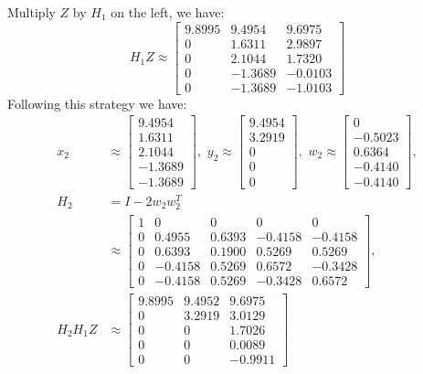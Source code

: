 \documentclass[11pt]{article}
\begin{document}
Multiply $Z$ by $H_1$ on the left, we have:
$$H_1Z \approx \begin{bmatrix} 
9.8995 & 9.4954 & 9.6975 \\
0 & 1.6311 & 2.9897 \\
0 & 2.1044 & 1.7320 \\
0 & -1.3689 & -0.0103 \\
0 & -1.3689 & -1.0103
\end{bmatrix} $$
Following this strategy we have:
\begin{equation}\begin{split} 
x_2 &\approx 
\begin{bmatrix} 
9.4954 \\ 1.6311 \\ 2.1044 \\ -1.3689 \\  -1.3689
\end{bmatrix},\,\,
y_2 \approx \begin{bmatrix} 
9.4954 \\ 3.2919 \\ 0\\ 0\\ 0
\end{bmatrix},\,\,
w_2 \approx \begin{bmatrix} 0 \\ -0.5023 \\ 0.6364 \\ -0.4140 \\ -0.4140\end{bmatrix},\\
H_2 &= I - 2w_2w_2^T\\
&\approx 
\begin{bmatrix} 
1 & 0 & 0 & 0 & 0 \\
0 & 0.4955 & 0.6393 & -0.4158 & -0.4158 \\
0 & 0.6393 & 0.1900 & 0.5269 & 0.5269 \\
0 & -0.4158 & 0.5269 & 0.6572 & -0.3428 \\
0 & -0.4158 & 0.5269 & -0.3428 & 0.6572
\end{bmatrix},\\
H_2H_1Z &\approx
\begin{bmatrix} 9.8995 & 9.4952 & 9.6975 \\
0 & 3.2919 & 3.0129 \\
0 & 0 & 1.7026 \\
0 & 0 & 0.0089 \\
0 & 0 & -0.9911 
\end{bmatrix} 
\end{split}\nonumber\end{equation} 
\end{document}
